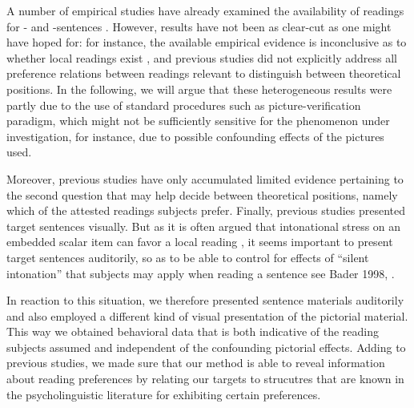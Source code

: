 \documentclass[fleqn,reqno,10pt,draft]{article}
\newcommand{\as}{\acro{as}}
\renewcommand{\es}{\acro{es}}
\begin{document}
A number of empirical studies have already examined the availability
of readings for \as- and \es-sentences
\citep[e.g.][]{GeurtsPouscoulous2009:Embedded-Implic,CliftonDube2010:Embedded-Implic,ChemlaSpector2010:Experimental-Ev}. However,
results have not been as clear-cut as one might have hoped for: for
instance, the available empirical evidence is inconclusive as to
whether local readings exist \citep[see also][for related
discussion]{Tielvan-Tiel2012:Embedded-Scalar}, and previous studies 
did not explicitly address all preference relations between readings relevant to
distinguish between theoretical positions. In the following, we will
argue that these heterogeneous results were partly due to the use of 
standard procedures such as picture-verification paradigm, which might not 
be sufficiently sensitive for the phenomenon under investigation,
for instance, due to possible confounding effects of the pictures used.

Moreover, previous studies have only accumulated limited evidence
pertaining to the second question that may help decide between
theoretical positions, namely which of the attested readings subjects
prefer. Finally, previous studies presented target sentences
visually. But as it is often argued that intonational stress on an
embedded scalar item can favor a local reading
\citep[e.g.][]{Horn2006:The-Border-Wars,Geurts2009:Scalar-Implicat,ChemlaSpector2010:Experimental-Ev,Geurts2010:Quantity-Implic,Tielvan-Tiel2012:Embedded-Scalar},
it seems important to present target sentences auditorily, so as to be
able to control for effects of ``silent intonation'' that subjects may
apply when reading a sentence see Bader 1998, \citep{Fodor1998:Learning}
.

In reaction to this situation, we therefore presented sentence
materials auditorily and also employed a different kind of visual
presentation of the pictorial material.
This way we obtained behavioral data that is both
indicative of the reading subjects assumed and independent of the
confounding pictorial effects. 
Adding to previous studies, we made sure that our method is able 
to reveal information about reading preferences by relating our 
targets to strucutres that are known in the psycholinguistic 
literature for exhibiting certain preferences. 
\end{document}
